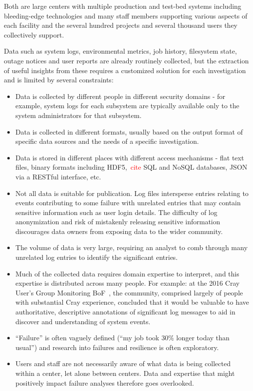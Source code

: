 Both are large centers with multiple production and test-bed systems including 
bleeding-edge technologies and many staff members supporting 
various aspects of each facility and the several hundred projects and several 
thousand users they collectively support.

Data such as system logs, environmental metrics, job history, filesystem state,
outage notices and user reports are already routinely collected, but the 
extraction of useful insights from these requires a customized solution for 
each investigation and is limited by several constraints:

\begin{itemize}
\item Data is collected by different people in different security domains - for
      example, system logs for each subsystem are typically available only to 
      the system administrators for that subsystem. 
\item Data is collected in different formats, usually based on the output format
      of specific data sources and the needs of a specific investigation.
\item Data is stored in different places with different access mechanisms - flat 
      text files, binary formats including HDF5,~\textcolor{red}{cite} SQL and 
      NoSQL databases, JSON via a RESTful interface, etc.
\item Not all data is suitable for publication. Log files intersperse entries
      relating to events contributing to some failure with unrelated entries
      that may contain sensitive information such as user login details. The 
      difficulty of log anonymization and risk of mistakenly releasing sensitive 
      information discourages data owners from exposing data to the wider 
      community.
\item The volume of data is very large, requiring an analyst to comb through 
      many unrelated log entries to identify the significant entries.
\item Much of the collected data requires domain expertise to interpret, and 
      this expertise is distributed across many people. For example: at the 
      2016 Cray User's Group Monitoring BoF~\cite{CUG2016BoF}, the community, 
      comprised largely of people with substantial Cray experience, concluded 
      that it would be valuable to have authoritative, descriptive annotations 
      of significant log messages to aid in discover and understanding of system 
      events.
\item ``Failure'' is often vaguely defined (``my job took 30\% longer today than 
      usual'') and research into failures and resilience is often exploratory.
\item Users and staff are not necessarily aware of what data is being collected
      within a center, let alone between centers. Data and expertise that might 
      positively impact failure analyses therefore goes overlooked.
\end{itemize}

